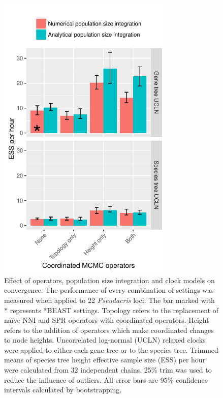 \documentclass[12pt]{article}
\begin{document}
\begin{figure}[htb!]
\centering
\includegraphics[height=14cm]{speciesTreeHeight_ess_per_hour.pdf}
\caption
{Effect of operators, population size integration and clock models on
convergence. The performance of every combination of settings was measured when
applied to 22 \textit{Pseudacris} loci. The bar marked with $\ast$ represents *BEAST
settings. Topology refers to the
replacement of na\"ive NNI and SPR operators with coordinated operators. Height
refers to the addition of operators which make coordinated changes to
node heights. Uncorrelated log-normal (UCLN) relaxed clocks were applied
to either each gene tree or to the species tree. Trimmed means of species tree
height effective sample size (ESS) per hour were calculated from 32 independent
chains. 25\% trim was used to reduce the influence of outliers. All error bars
are 95\% confidence intervals calculated by bootstrapping.}
\label{fig:realEssPerHour}
\end{figure}
\end{document}
